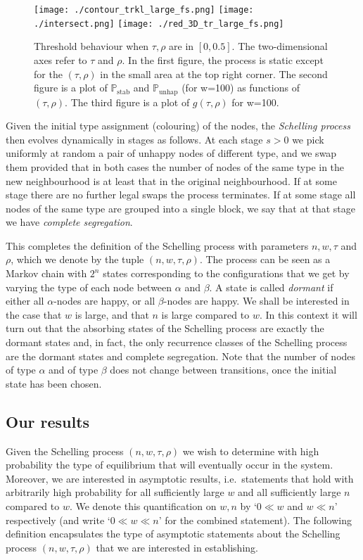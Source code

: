 \documentclass[11pt]{article}
\theoremstyle{plain}
\numberwithin{equation}{subsection}
\newcommand{\Punhap}{\mathbb{P}_{\textrm{unhap}}}
\newcommand{\Pstab}{\mathbb{P}_{\textrm{stab}}}
\begin{document}
 \begin{figure} 
\texttt{[image: ./contour\_trkl\_large\_fs.png]}\hspace{0.5cm}
\texttt{[image: ./intersect.png]}\hspace{0.5cm}
\texttt{[image: ./red\_3D\_tr\_large\_fs.png]}\centering
 \caption{Threshold behaviour when $\tau,\rho$ are in $[0, 0.5]$. The two-dimensional axes  refer to $\tau$ and $\rho$.
 In the first figure, the process is static except for the $(\tau,\rho)$ in the small area at the top right corner. The second figure
 is a plot of $\Pstab$ and $\Punhap$ (for w=100) as functions of $(\tau,\rho)$. The third figure is a plot of 
 $g(\tau,\rho)$ for w=100.}\label{fig:red_3D_tr}
\end{figure}  

Given the initial type assignment (colouring) of the nodes, 
the {\em Schelling process} then evolves 
dynamically in stages as follows. 
At each stage $s>0$ we pick uniformly at random a pair of 
unhappy nodes of different type, and we swap them provided that
in both cases the number of nodes of the 
same type in the new neighbourhood is at least that in the original neighbourhood.
If at some stage there are no further legal swaps the process terminates. 
If at some stage all nodes of the same type are grouped into a single block, 
we say that at that stage we have {\em complete segregation}.

This completes the definition of the Schelling process with parameters $n,w,\tau$ and $\rho$, 
which we denote by the tuple $(n, w, \tau, \rho)$.   
The process can be seen as a Markov chain with $2^n$ states
corresponding to the configurations that we get by varying the
type of each node between $\alpha$ and $\beta$. 
A state is called {\em dormant} if either all $\alpha$-nodes are happy, or
all $\beta$-nodes are happy.
We shall be interested in the case that $w$ is large, 
and that $n$ is large compared to $w$.  
In this context it will turn out that the absorbing states of the Schelling process are
exactly the dormant states and, in fact, the only recurrence classes of the Schelling
process are the dormant states and 
complete segregation. 
Note that the number of nodes
of type $\alpha$ and of type $\beta$ 
does not change between transitions, 
once the initial state has been chosen.


\subsection{Our results}\label{se:ourresults}
Given the Schelling process $(n, w, \tau, \rho)$ we wish to determine with high
probability the
type of equilibrium that will eventually occur in the system.
Moreover, we are interested in asymptotic results, i.e.\ statements that
hold with arbitrarily high probability for all sufficiently large $w$ and all sufficiently large $n$ compared to $w$.
We denote this quantification on $w, n$ 
by `$0\ll w$ and $w\ll n$' respectively (and
write `$0\ll w\ll n$' for the combined statement). 
The following definition encapsulates the type of 
asymptotic statements about the Schelling process
$(n,w,\tau, \rho)$ that we are interested in establishing.
\end{document}
